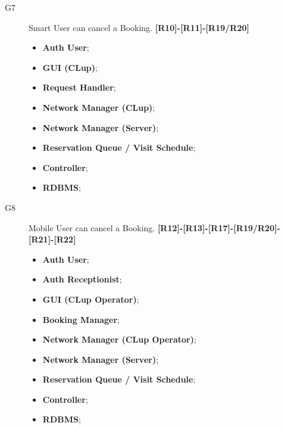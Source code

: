 \begin{description}
    \item[G7]Smart User can cancel a Booking. \textbf{[R10]-[R11]-[R19/R20]}
    \begin{itemize}
        \item \textbf{Auth User}; 
        \item \textbf{GUI (CLup)};  
        \item \textbf{Request Handler}; 
        \item \textbf{Network Manager (CLup)}; 
        \item \textbf{Network Manager (Server)};  
        \item \textbf{Reservation Queue / Visit Schedule};  
        \item \textbf{Controller};
        \item \textbf{RDBMS};
    \end{itemize}
    
    \item[G8]Mobile User can cancel a Booking. \textbf{[R12]-[R13]-[R17]-[R19/R20]-[R21]-[R22]}
    \begin{itemize}
        \item \textbf{Auth User};
        \item \textbf{Auth Receptionist};
        \item \textbf{GUI (CLup Operator)};  
        \item \textbf{Booking Manager}; 
        \item \textbf{Network Manager (CLup Operator)}; 
        \item \textbf{Network Manager (Server)};  
        \item \textbf{Reservation Queue / Visit Schedule};  
        \item \textbf{Controller};
        \item \textbf{RDBMS};
    \end{itemize}
    
\end{description}
